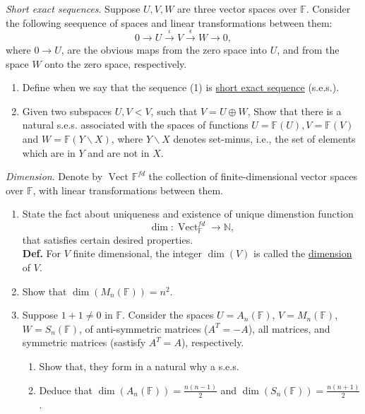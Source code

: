 \documentclass{article}
\begin{document}
\begin{problem}
    \textit{Short exact sequences}. Suppose $U,V,W$ are three vector spaces over $\mathbb{F}$. Consider the following seequence of spaces and linear transformations between them:
    \begin{equation}
        0 \xrightarrow{} U \xrightarrow{\iota} V \xrightarrow{\epsilon} W \xrightarrow{} 0,
    \end{equation}
    where $0 \to U$, are the obvious maps from the zero space into $U$, and from the space $W$ onto the zero space, respectively. \\
    \begin{enumerate}
        \item Define when we say that the sequence (1) is \underline{short exact sequence} (s.e.s.).
        \item Given two subspaces $U,V < V$, such that $V = U \oplus W$, Show that there is a natural s.e.s. associated with the spaces of functions $U = \mathbb{F}(U), V = \mathbb{F}(V)$ and $W = \mathbb{F}(Y \backslash X)$, where $Y \backslash X$ denotes set-minus, i.e., the set of elements which are in $Y$ and are not in $X$.
    \end{enumerate}
\end{problem}


\begin{problem}
    \textit{Dimension}. Denote by $\operatorname{Vect}_{}\mathbb{F}^{fd}$ the collection of finite-dimensional vector spaces over $\mathbb{F}$, with linear transformations between them.
    \begin{enumerate}
        \item State the fact about uniqueness and existence of unique dimenstion function
        \[
            \dim: \operatorname{Vect}_\mathbb{F}^{fd} \to \mathbb{N},
        \]
        that satisfies certain desired properties. \\
        \textbf{Def.} For $V$ finite dimensional, the integer $\dim(V)$ is called the \underline{dimension} of $V$.
        \item Show that $\dim(M_n(\mathbb{F})) = n^2$.
        \item Suppose $1 + 1 \neq 0$ in $\mathbb{F}$. Consider the spaces $U = A_n(\mathbb{F})$, $V = M_n(\mathbb{F})$, $W = S_n(\mathbb{F})$, of anti-symmetric matrices ($A^T = -A$), all matrices, and symmetric matrices (sastisfy $A^T = A$), respectively.
        \begin{enumerate}
            \item Show that, they form in a natural why a s.e.s.
            \item Deduce that $\dim(A_n(\mathbb{F})) = \frac{n(n-1)}{2}$ and $\dim(S_n(\mathbb{F})) = \frac{n(n+1)}{2}$.
        \end{enumerate}
    \end{enumerate}
\end{problem}
\end{document}
